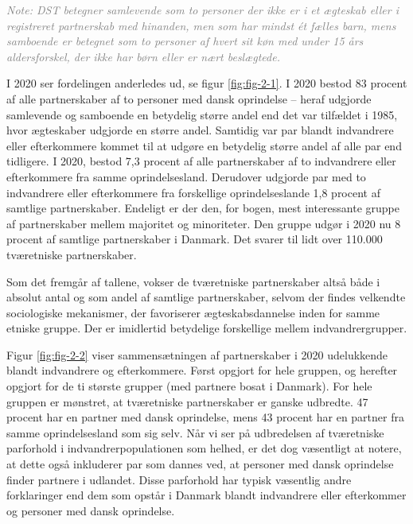 \documentclass[
]{book}
\begin{document}
\begin{footnotesize}\textit{\textcolor{gray}{
Note: DST betegner samlevende som to personer der ikke er i et ægteskab eller i registreret partnerskab med hinanden, men som har mindst ét fælles barn, mens samboende er betegnet som to personer af hvert sit køn med under 15 års aldersforskel, der ikke har børn eller er nært beslægtede.
}}
\end{footnotesize}

\newpage

I 2020 ser fordelingen anderledes ud, se figur \ref{fig:fig-2-1}. I 2020 bestod 83 procent af alle partnerskaber af to personer med dansk oprindelse -- heraf udgjorde samlevende og samboende en betydelig større andel end det var tilfældet i 1985, hvor ægteskaber udgjorde en større andel. Samtidig var par blandt indvandrere eller efterkommere kommet til at udgøre en betydelig større andel af alle par end tidligere. I 2020, bestod 7,3 procent af alle partnerskaber af to indvandrere eller efterkommere fra samme oprindelsesland. Derudover udgjorde par med to indvandrere eller efterkommere fra forskellige oprindelseslande 1,8 procent af samtlige partnerskaber. Endeligt er der den, for bogen, mest interessante gruppe af partnerskaber mellem majoritet og minoriteter. Den gruppe udgør i 2020 nu 8 procent af samtlige partnerskaber i Danmark. Det svarer til lidt over 110.000 tværetniske partnerskaber.

Som det fremgår af tallene, vokser de tværetniske partnerskaber altså både i absolut antal og som andel af samtlige partnerskaber, selvom der findes velkendte sociologiske mekanismer, der favoriserer ægteskabsdannelse inden for samme etniske gruppe. Der er imidlertid betydelige forskellige mellem indvandrergrupper.

Figur \ref{fig:fig-2-2} viser sammensætningen af partnerskaber i 2020 udelukkende blandt indvandrere og efterkommere. Først opgjort for hele gruppen, og herefter opgjort for de ti største grupper (med partnere bosat i Danmark). For hele gruppen er mønstret, at tværetniske partnerskaber er ganske udbredte. 47 procent har en partner med dansk oprindelse, mens 43 procent har en partner fra samme oprindelsesland som sig selv. Når vi ser på udbredelsen af tværetniske parforhold i indvandrerpopulationen som helhed, er det dog væsentligt at notere, at dette også inkluderer par som dannes ved, at personer med dansk oprindelse finder partnere i udlandet. Disse parforhold har typisk væsentlig andre forklaringer end dem som opstår i Danmark blandt indvandrere eller efterkommer og personer med dansk oprindelse.
\end{document}

